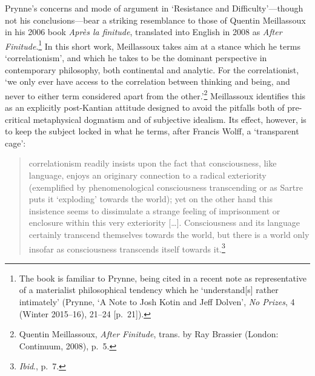 \documentclass[]{article}
\begin{document}
Prynne's concerns and mode of argument in `Resistance and
Difficulty'---though not his conclusions---bear a striking resemblance
to those of Quentin Meillassoux in his 2006 book \emph{Après la
finitude}, translated into English in 2008 as \emph{After
Finitude}.\footnote{The book is familiar to Prynne, being cited in a
  recent note as representative of a materialist philosophical tendency
  which he `understand{[}s{]} rather intimately' (Prynne, `A Note to
  Josh Kotin and Jeff Dolven', \emph{No Prizes}, 4 (Winter 2015--16),
  21--24 {[}p.~21{]}).} In this short work, Meillassoux takes aim at a
stance which he terms `correlationism', and which he takes to be the
dominant perspective in contemporary philosophy, both continental and
analytic. For the correlationist, `we only ever have access to the
correlation between thinking and being, and never to either term
considered apart from the other.'\footnote{Quentin Meillassoux,
  \emph{After Finitude}, trans. by Ray Brassier (London: Continuum,
  2008), p.~5.} Meillassoux identifies this as an explicitly
post-Kantian attitude designed to avoid the pitfalls both of
pre-critical metaphysical dogmatism and of subjective idealism. Its
effect, however, is to keep the subject locked in what he terms, after
Francis Wolff, a `transparent cage':

\begin{quote}
correlationism readily insists upon the fact that consciousness, like
language, enjoys an originary connection to a radical exteriority
(exemplified by phenomenological consciousness transcending or as Sartre
puts it `exploding' towards the world); yet on the other hand this
insistence seems to dissimulate a strange feeling of imprisonment or
enclosure within this very exteriority {[}\ldots{}{]}. Consciousness and
its language certainly transcend themselves towards the world, but there
is a world only insofar as consciousness transcends itself towards
it.\footnote{\emph{Ibid}., p.~7.}
\end{quote}
\end{document}
